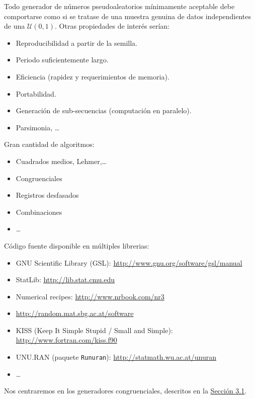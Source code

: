 \documentclass[]{book}
\theoremstyle{definition}
\theoremstyle{definition}
\theoremstyle{definition}
\theoremstyle{remark}
\begin{document}
Todo generador de números pseudoaleatorios mínimamente aceptable debe
comportarse como si se tratase de una muestra genuina de datos
independientes de una \(\mathcal{U}(0,1)\). Otras propiedades de interés
serían:

\begin{itemize}
\item
  Reproducibilidad a partir de la semilla.
\item
  Periodo suficientemente largo.
\item
  Eficiencia (rapidez y requerimientos de memoria).
\item
  Portabilidad.
\item
  Generación de sub-secuencias (computación en paralelo).
\item
  Parsimonia, \ldots{}
\end{itemize}

Gran cantidad de algoritmos:

\begin{itemize}
\item
  Cuadrados medios, Lehmer,\ldots{}
\item
  Congruenciales
\item
  Registros desfasados
\item
  Combinaciones
\item
  \ldots{}
\end{itemize}

Código fuente disponible en múltiples librerias:

\begin{itemize}
\item
  GNU Scientific Library (GSL):
  \href{http://www.gnu.org/software/gsl/manual/html_node/Random-Number-Generation.html}{http://www.gnu.org/software/gsl/manual}
\item
  StatLib: \url{http://lib.stat.cmu.edu}
\item
  Numerical recipes: \url{http://www.nrbook.com/nr3}
\item
  \url{http://random.mat.sbg.ac.at/software}
\item
  KISS (Keep It Simple Stupid / Small and Simple):
  \url{http://www.fortran.com/kiss.f90}
\item
  UNU.RAN (paquete \texttt{Runuran}):
  \url{http://statmath.wu.ac.at/unuran}
\item
  \ldots{}
\end{itemize}

Nos centraremos en los generadores congruenciales, descritos en la
\protect\hyperlink{generadores-congruenciales}{Sección 3.1}.
\end{document}

